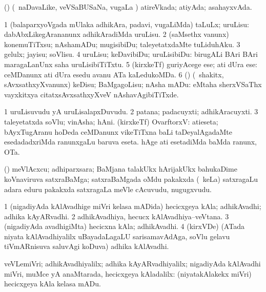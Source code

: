 \bentry
{}
\gl{\gu}
\bmng
(\AmA) (\kanmu\ naDavaLike, veVSaBUSaNa, \mo vugaLa \vi) atireVkada; atiyAda; asahayxvAda. 
\emng
\eentry

\bentry
{}
\gl{\sakirx}
\bmng
\bnum
\num{1} (balaparxyoVgada mUlaka adhikAra, padavi, \mo vugaLiMda) taLuLx; uruLisu:  dabAbxLikegArananunx adhikAradiMda uruLisu. 
\num{2} (saMsethx \mo vanunx) konemuTiTxsu; nAshamADu; mugisibiDu; taleyetatxdaMte tuLiduhAku. 
\num{3} gelulx; jayisu; soVlisu. 
\num{4} uruLisu; keDavibiDu; uruLisibiDu:  birugALi BAri BAri maragaLanUnx saha uruLisibiTiTxtu. 
\num{5} (kirxkeTf) guriyAcege ese; ati dUra ese:  ceMDanunx ati dUra esedu avanu ATa kaLedukoMDa. 
\num{6} (\pArxparx) (\kanmu\ shakitx, sAvxsathxyXvanunx) keDisu; BaMgagoLisu; nAsha mADu:  eMtaha sherxVSaThx vayxkitxya citatxsAvxsathxyXveV nAshavAgibiTiTxde. 
\enum
\emng
\eentry

\bentry
{}
\gl{\nA}
\bmng
\bnum
\num{1} uruLisuvudu yA uruLisalapxDuvudu. 
\num{2} patana; padacuyxti; adhikAracuyxti. 
\num{3} taleyetatxda soVlu; vinAsha; hAni. 
 (kirxkeTf) OvarftorxV: 
\banum
{} atieseta; bAyxTugAranu hoDeda ceMDanunx vikeTiTxna baLi taDeyalAgadaMte esedadadxriMda ranunxgaLu baruva eseta. 
 hAge ati esetadiMda baMda ranunx, OTa. 
\eanum
\numie
\enum
\emng
\eentry

\bentry
{}
\gl{\nA}
\bmng
(\BUvi) meVlAcxcu; adhiparxsara; BaMjana talakUkx hArijakUkx bahukaDime koVnaviruva satxraBaMga; satxraBaMgada oMdu pakakxda (\kanmu\ keLa) satxragaLu adara eduru pakakxda satxragaLa meVle cAcuvudu, nugugxvudu. 
\emng
\eentry

\bentry
{}
\gl{\nA}
\bmng
\bnum
\num{1} (nigadiyAda kAlAvadhige miVri kelasa mADida) hecicxgeya kAla; adhikAvadhi; adhika kAyARvadhi. 
\num{2} adhikAvadhiya, hecucx kAlAvadhiya--veVtana. 
\num{3} (nigadiyAda avadhigiMta) hecicxna kAla; adhikAvadhi. 
\num{4} (kirxVDe) (ATada niyata kAlAvadhiyalilx uBayadaLagaLU sarisamavAdAga, soVlu gelavu tiVmARnisuva saluvAgi koDuva) adhika kAlAvadhi. 
\enum
\emng
\eentry

\bentry
{}
\gl{\kirxvi}
\bmng
veVLemiVri; adhikAvadhiyalilx; adhika kAyARvadhiyalilx; nigadiyAda kAlAvadhi miVri, muMce yA anaMtarada, hecicxgeya kAladalilx:  (niyatakAlakekx miVri) hecicxgeya kAla kelasa mADu. 
\emng
\eentry

